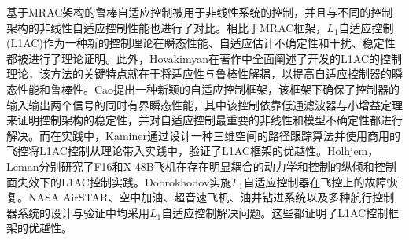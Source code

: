 基于MRAC架构的鲁棒自适应控制被用于非线性系统的控制，并且与不同的控制架构的非线性自适应控制性能也进行了对比\cite{kharisov2010comparison,kharisov2014comparison}。相比于MRAC框架，$L_{1}$自适应控制(L1AC)作为一种新的控制理论在瞬态性能、自适应估计不确定性和干扰、稳定性都被进行了理论证明\cite{Cao2006Design,cao2008adaptive,cao2010stability,wang2011l1,Hovakimyan2008adaptive}。此外，Hovakimyan在著作中全面阐述了开发的L1AC的控制理论，该方法的关键特点就在于将适应性与鲁棒性解耦，以提高自适应控制器的瞬态性能和鲁棒性\cite{hovakimyan2010L1}。Cao提出一种新颖的自适应控制框架，该框架下确保了控制器的输入输出两个信号的同时有界瞬态性能，其中该控制依靠低通滤波器与小增益定理来证明控制架构的稳定性，并对自适应控制最重要的非线性和模型不确定性都进行解决\cite{cao2010design,Cao2006Design1,Cao2006Design2,Cheng2008L1,Cao2008L1}。而在实践中，Kaminer通过设计一种三维空间的路径跟踪算法并使用商用的飞控将L1AC控制从理论带入实践中，验证了L1AC框架的优越性\cite{Kaminer2010Path}。Holhjem，Leman分别研究了F16和X-48B飞机在存在明显耦合的动力学和控制的纵倾和控制面失效下的L1AC控制实践\cite{holhjem2012l1,leman2010l1}。Dobrokhodov实施$L_{1}$自适应控制器在飞控上的故障恢复\cite{dobrokhodov2008flight}。NASA AirSTAR\cite{gregory2009l1}、空中加油\cite{wang2009l1,Wise2008Verifiable}、超音速飞机\cite{Lei2007Design}、油井钻进系统\cite{Zhiyuan2009Integrated}以及多种航行控制器系统的设计与验证\cite{dobrokhodov2008flight,wang2008l1,aguiar2008time,kharisov2008l1}中均采用$L_{1}$自适应控制解决问题。这些都证明了L1AC控制框架的优越性。

